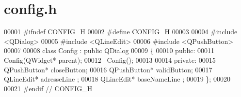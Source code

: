 \section{config.\-h}

\begin{DoxyCode}
00001 \textcolor{preprocessor}{#ifndef CONFIG\_H}
00002 \textcolor{preprocessor}{}\textcolor{preprocessor}{#define CONFIG\_H}
00003 \textcolor{preprocessor}{}
00004 \textcolor{preprocessor}{#include <QDialog>}
00005 \textcolor{preprocessor}{#include <QLineEdit>}
00006 \textcolor{preprocessor}{#include <QPushButton>}
00007 
00008 \textcolor{keyword}{class }Config : \textcolor{keyword}{public} QDialog
00009 \{
00010 \textcolor{keyword}{public}:
00011     Config(QWidget* parent);
00012     ~Config();
00013 
00014 \textcolor{keyword}{private}:
00015     QPushButton*    closeButton;
00016     QPushButton*    validButton;
00017     QLineEdit*      adresseLine ;
00018     QLineEdit*      baseNameLine ;
00019 \};
00020 
00021 \textcolor{preprocessor}{#endif // CONFIG\_H}
\end{DoxyCode}
